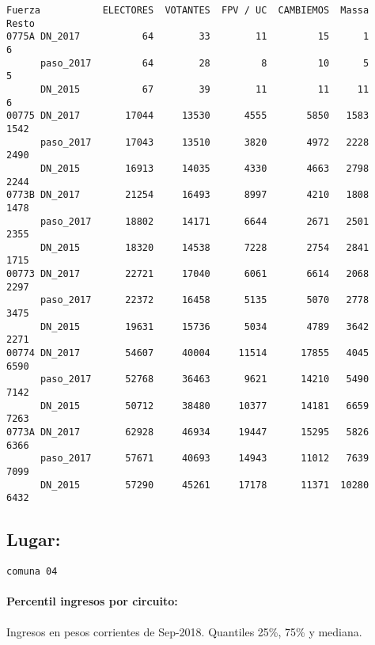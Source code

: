 \documentclass[11pt]{article}
\begin{document}
    \begin{verbatim}
Fuerza           ELECTORES  VOTANTES  FPV / UC  CAMBIEMOS  Massa  Resto
0775A DN_2017           64        33        11         15      1      6
      paso_2017         64        28         8         10      5      5
      DN_2015           67        39        11         11     11      6
00775 DN_2017        17044     13530      4555       5850   1583   1542
      paso_2017      17043     13510      3820       4972   2228   2490
      DN_2015        16913     14035      4330       4663   2798   2244
0773B DN_2017        21254     16493      8997       4210   1808   1478
      paso_2017      18802     14171      6644       2671   2501   2355
      DN_2015        18320     14538      7228       2754   2841   1715
00773 DN_2017        22721     17040      6061       6614   2068   2297
      paso_2017      22372     16458      5135       5070   2778   3475
      DN_2015        19631     15736      5034       4789   3642   2271
00774 DN_2017        54607     40004     11514      17855   4045   6590
      paso_2017      52768     36463      9621      14210   5490   7142
      DN_2015        50712     38480     10377      14181   6659   7263
0773A DN_2017        62928     46934     19447      15295   5826   6366
      paso_2017      57671     40693     14943      11012   7639   7099
      DN_2015        57290     45261     17178      11371  10280   6432
    \end{verbatim}

    
    \hypertarget{lugar}{%
\subsection{Lugar:}\label{lugar}}

    
    \begin{Verbatim}[commandchars=\\\{\}]
comuna 04

    \end{Verbatim}

    \hypertarget{percentil-ingresos-por-circuito}{%
\paragraph{Percentil ingresos por
circuito:}\label{percentil-ingresos-por-circuito}}

    
    Ingresos en pesos corrientes de Sep-2018. Quantiles 25\%, 75\% y
mediana.

    
    
\end{document}

